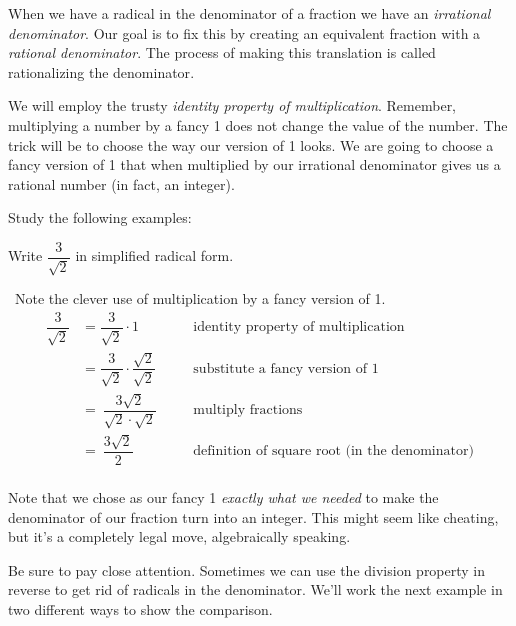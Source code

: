 When we have a radical in the denominator of a fraction we have an \textit{irrational denominator}. Our goal is to fix this by creating an equivalent fraction with a \textit{rational denominator}. The process of making this translation is called \gls{rationalizing the denominator}.

We will employ the trusty \textit{identity property of multiplication}. Remember, multiplying a number by a fancy 1 does not change the value of the number. The trick will be to choose the way our version of 1 looks. We are going to choose a fancy version of 1 that when multiplied by our irrational denominator gives us a rational number (in fact, an integer).

Study the following examples:

\begin{boxedex}
Write $\dfrac{3}{\sqrt{2}}$ in simplified radical form.

\exsoln\ Note the clever use of multiplication by a fancy version of 1.
\[\begin{aligned}
\dfrac{3}{\sqrt{2}} &= \dfrac{3}{\sqrt{2}} \cdot 1
&&\quad\text{identity property of multiplication}\\
&= \dfrac{3}{\sqrt{2}} \cdot \dfrac{\sqrt{2}}{\sqrt{2}}
&&\quad\text{substitute a fancy version of 1}\\
&=~ \dfrac{3 \sqrt{2}}{\sqrt{2} \cdot \sqrt{2}}
&&\quad\text{multiply fractions}\\
&=~ \dfrac{3 \sqrt{2}}{2}
&&\quad\text{definition of square root (in the denominator)}\\
\end{aligned}
\]
\end{boxedex}

Note that we chose as our fancy 1 \textit{exactly what we needed} to make the denominator of our fraction turn into an integer. This might seem like cheating, but it's a completely legal move, algebraically speaking.

Be sure to pay close attention. Sometimes we can use the division property in reverse to get rid of radicals in the denominator. We'll work the next example in two different ways to show the comparison.


